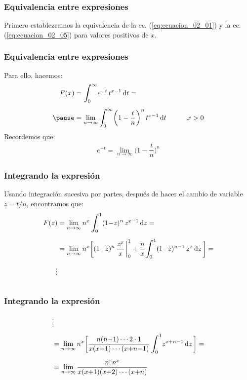 \documentclass[12pt]{beamer}
\begin{document}
\begin{frame}
\frametitle{Equivalencia entre expresiones}
Primero establezcamos la equivalencia de la ec. (\ref{eq:ecuacion_02_01}) y la ec. (\ref{eq:ecuacion_02_05}) para valores positivos de $x$.
\end{frame}
\begin{frame}
\frametitle{Equivalencia entre expresiones}
Para ello, hacemos:
\pause
\begin{eqnarray}
\begin{aligned}
F(x) &= \scaleint{6ex}_{\bs 0}^{\infty} e^{-t} \, t^{x- 1} \dd{t} = \\[0.5em] \pause
&= \lim_{n \to \infty} \scaleint{6ex}_{\bs 0}^{\infty} \bigg( 1 - \dfrac{t}{n} \bigg)^{n} \, t^{x-1} \dd{t} \hspace{1cm} x > 0
\end{aligned}
\label{eq:ecuacion_02_06}
\end{eqnarray}
\pause
Recordemos que:
\begin{align}
e^{-t} = \lim_{n \to \infty} \bigg( 1 - \dfrac{t}{n} \bigg)^{n}
\label{eq:ecuacion_02_07}
\end{align}
\end{frame}
\begin{frame}
\frametitle{Integrando la expresión}
Usando integración sucesiva por partes, después de hacer el cambio de variable $z = t/n$, encontramos que:
\pause
\begin{eqnarray*}
\begin{aligned}[b]
F(z) &= \lim_{n \to \infty} n^{x} \, \scaleint{6ex}_{\bs 0}^{1} (1 {-} z)^{n} \, z^{x-1} \dd{z} = \\[0.5em]
&= \lim_{n \to \infty} n^{x} \bigg[ (1 {-} z)^{n} \, \dfrac{z^{x}}{x} \eval_{0}^{1} + \dfrac{n}{x} \scaleint{6ex}_{\bs 0}^{1} (1 {-} z)^{n-1} \, z^{x} \dd{z} \bigg] = \\[0.5em]
\vdots& \\[0.5em]
\end{aligned}
\end{eqnarray*}
\end{frame}
\begin{frame}
\frametitle{Integrando la expresión}
\begin{eqnarray}
\begin{aligned}[b]
&\vdots \\[0.5em]
&= \lim_{n \to \infty} n^{x} \bigg[ \dfrac{n (n {-} 1) \cdots 2 \cdot 1}{x (x {+} 1) \cdots (x {+} n {-} 1)} \, \scaleint{6ex}_{\bs 0}^{1} z^{x+n-1} \dd{z} \bigg] = \\[0.5em]
&= \lim_{n \to \infty} \dfrac{n! \, n^{x}}{x (x {+} 1)(x {+} 2) \cdots (x {+} n)}
\end{aligned}
\label{eq:ecuacion_02_08}
\end{eqnarray}
\end{frame}
\end{document}
